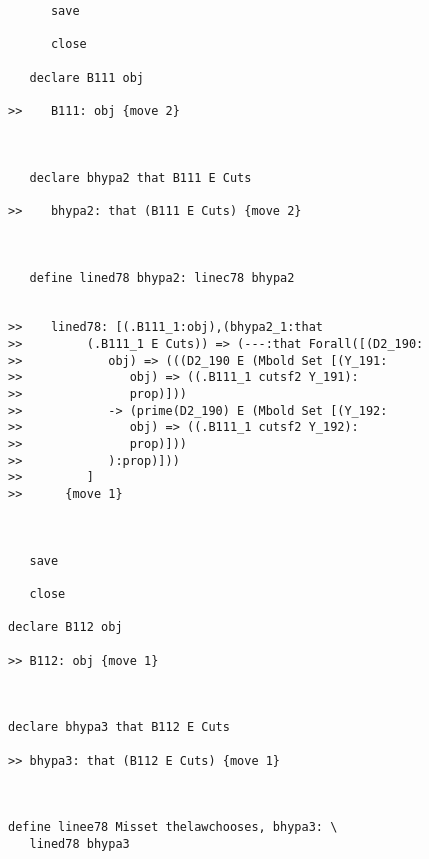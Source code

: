 \documentclass[12pt]{article}
\begin{document}
\begin{verbatim}
      save

      close

   declare B111 obj

>>    B111: obj {move 2}



   declare bhypa2 that B111 E Cuts

>>    bhypa2: that (B111 E Cuts) {move 2}



   define lined78 bhypa2: linec78 bhypa2


>>    lined78: [(.B111_1:obj),(bhypa2_1:that
>>         (.B111_1 E Cuts)) => (---:that Forall([(D2_190:
>>            obj) => (((D2_190 E (Mbold Set [(Y_191:
>>               obj) => ((.B111_1 cutsf2 Y_191):
>>               prop)]))
>>            -> (prime(D2_190) E (Mbold Set [(Y_192:
>>               obj) => ((.B111_1 cutsf2 Y_192):
>>               prop)]))
>>            ):prop)]))
>>         ]
>>      {move 1}



   save

   close

declare B112 obj

>> B112: obj {move 1}



declare bhypa3 that B112 E Cuts

>> bhypa3: that (B112 E Cuts) {move 1}



define linee78 Misset thelawchooses, bhypa3: \
   lined78 bhypa3


\end{verbatim}
\end{document}
